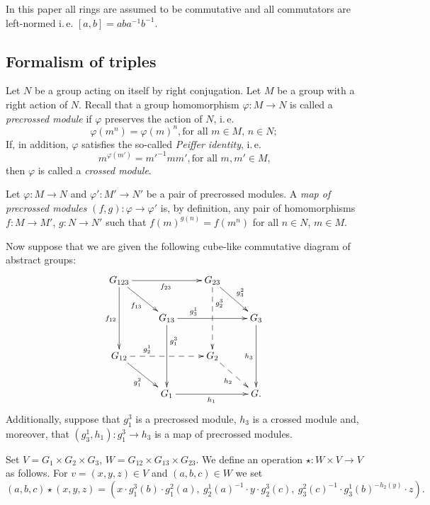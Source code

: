 In this paper all rings are assumed to be commutative and all commutators are left-normed i.\,e. $[a, b] = a b a^{-1} b^{-1}$.

\subsection{Formalism of triples}\label{subsec:triples}

Let $N$ be a group acting on itself by right conjugation.
Let $M$ be a group with a right action of $N$.
Recall that a group homomorphism $\varphi\colon M \to N$ is called a \textit{precrossed module} if $\varphi$ preserves the action of $N$, i.\,e.
\[\varphi(m^n) = \varphi(m)^n, \text{for all $m \in M$, $n\in N;$} \]
If, in addition, $\varphi$ satisfies the so-called \textit{Peiffer identity}, i.\,e.
\[{m}^{\varphi(m')} = {m'}^{-1} m m', \text{for all $m, m' \in M$,}\]
then $\varphi$ is called a \textit{crossed module}.

Let $\varphi\colon M \to N$ and $\varphi' \colon M' \to N'$ be a pair of precrossed modules.
A \textit{map of precrossed modules} $(f, g)\colon \varphi \to \varphi'$ is, by definition, any pair of homomorphisms
$f \colon M \to M'$, $g \colon N \to N'$ such that ${f(m)}^{g(n)} = f(m^n)$ for all $n \in N$, $m \in M$.

Now suppose that we are given the following cube-like commutative diagram of abstract groups:
\begin{equation} \label{eq:cube} \begin{split} \xymatrix{
    G_{123} \ar[rr]_{f_{23}} \ar[dd]_{f_{12}} \ar[rd]_{f_{13}} &                        & G_{23} \ar@{-->}[dd]^(.3){g_2^3} \ar[rd]^{g^2_3} &           \\
    & G_{13} \ar[rr]^(.3){g^1_3} \ar^(.3){g^3_1}[dd] &                   & G_3 \ar[dd]_{h_3} \\
    G_{12} \ar@{-->}[rr]^(.3){g_2^1} \ar[rd]_{g_1^2}          &                        & G_2 \ar@{-->}[rd]_{h_2}         &           \\
    & G_1 \ar[rr]_{h_1}              &                   & G.} \end{split} \end{equation}
Additionally, suppose that $g_1^3$ is a precrossed module, $h_3$ is a crossed module and, moreover, that $(g_3^1, h_1) \colon g_1^3 \to h_3$ is a map of precrossed modules.

Set $V = G_1 \times G_2 \times G_3$, $W = G_{12} \times G_{13} \times G_{23}$.
We define an operation $\star \colon W \times V \to V$ as follows. For $v = (x, y, z) \in V$ and $(a, b, c) \in W$ we set
\[(a, b, c) \star (x, y, z) = (x \cdot g_1^3(b) \cdot g_1^2(a),\ g_2^1(a)^{-1} \cdot y \cdot g_2^3(c),\ g_3^2(c)^{-1} \cdot g_3^1(b)^{-h_2(y)} \cdot z).\]

